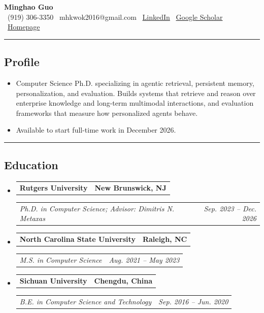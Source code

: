 \documentclass[11pt,letterpaper]{article}
\makeatletter
\newcommand{\headerrow}[2]
{\begin{tabular*}{\linewidth}{l@{\extracolsep{\fill}}r}
#1 & #2 \\
\end{tabular*}}
\makeatother
\begin{document}
\begin{center}
    {\LARGE \textbf{Minghao Guo}}
    \vspace{0.1cm}
    \\
    \raisebox{-0.2\height}{\Large \faPhoneSquare}\ (919) 306-3350
    \hfill \raisebox{-0.2\height}{\Large \faEnvelopeSquare}\ mhkwok2016@gmail.com
    \hfill \raisebox{-0.2\height}{\Large \faLinkedinSquare}\ \href{https://www.linkedin.com/in/minghao-guo-181b4b168/}{LinkedIn}
    \hfill \raisebox{-0.2\height}{\Large \faGraduationCap}\ \href{https://scholar.google.com/citations?user=T4w7A8IAAAAJ\&hl=zh-CN}{Google Scholar}
    \hfill \raisebox{-0.2\height}{\Large \faGlobe}\ \href{https://minghokwok.github.io/}{Homepage}
\end{center}

\hrule
\vspace{-1em}
\subsection*{\Large Profile}

\begin{itemize}[leftmargin=1em]
    \item Computer Science Ph.D. specializing in agentic retrieval, persistent memory, personalization, and evaluation. Builds systems that retrieve and reason over enterprise knowledge and long-term multimodal interactions, and evaluation frameworks that measure how personalized agents behave.
    \item Available to start full-time work in December 2026.
\end{itemize}

\hrule
\vspace{-1em}
\subsection*{\Large Education}

\begin{itemize}[leftmargin=1em]
    \parskip=0.1em

    \item
    \headerrow
        {\textbf{Rutgers University}}
        {\textbf{New Brunswick, NJ}}
    \headerrow
        {\emph{Ph.D. in Computer Science; Advisor: Dimitris N. Metaxas}}
        {\emph{Sep. 2023 -- Dec. 2026}}

    \item
    \headerrow
        {\textbf{North Carolina State University}}
        {\textbf{Raleigh, NC}}
    \headerrow
        {\emph{M.S. in Computer Science}}
        {\emph{Aug. 2021 -- May 2023}}

    \item
    \headerrow
        {\textbf{Sichuan University}}
        {\textbf{Chengdu, China}}
    \headerrow
        {\emph{B.E. in Computer Science and Technology}}
        {\emph{Sep. 2016 -- Jun. 2020}}
\end{itemize}
\end{document}
